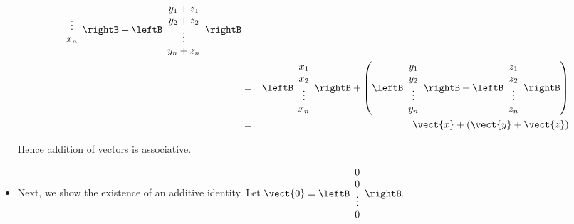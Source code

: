 \begin{solution}
\begin{itemize}
\begin{eqnarray*}
\begin{array}{c}
\vdots \\
x_n 
\end{array} \rightB + 
\leftB \begin{array}{c}
 y_1 + z_1 \\
 y_2 + z_2\\
\vdots \\
y_n + z_n
\end{array} \rightB \\
&=& 
\leftB \begin{array}{c}
x_1 \\
x_2  \\
\vdots \\
x_n 
\end{array} \rightB + \left(
\leftB \begin{array}{c}
 y_1  \\
 y_2 \\
\vdots \\
y_n 
\end{array} \rightB + \leftB \begin{array}{c}
 z_1  \\
 z_2 \\
\vdots \\
z_n 
\end{array} \rightB \right) \\
&=& \vect{x} + \left( \vect{y} + \vect{z} \right)
\end{eqnarray*}

Hence addition of vectors is associative. 

\item
Next, we show the existence of an additive identity. Let $\vect{0} = \leftB \begin{array}{c}
0 \\
0 \\
\vdots \\
0
\end{array}
\rightB.$ 


\end{itemize}
\end{solution}
